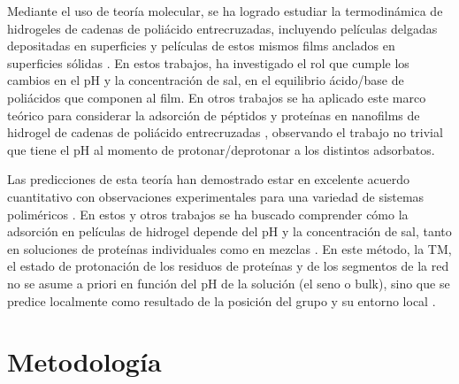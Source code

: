 Mediante el uso de teor\'ia  molecular, se ha logrado estudiar la termodin\'amica de hidrogeles de cadenas de poli\'acido entrecruzadas, incluyendo pel\'iculas delgadas depositadas en superficies \cite{longo2012molecular,nap2006weak} y pel\'iculas  de estos mismos films anclados en superficies s\'olidas \cite{longo2014non,longo2014equilibrium}.
En estos trabajos, \citet{longo2014equilibrium} ha investigado el rol que cumple los cambios en el pH y la concentraci\'on de sal, en el equilibrio \'acido/base de poli\'acidos que componen al film. En otros trabajos se ha aplicado este marco te\'orico para considerar la adsorci\'on de p\'eptidos y prote\'inas en nanofilms de hidrogel de cadenas de poli\'acido entrecruzadas \cite{longo2014equilibrium,narambuena2015lysozyme,longo2016adsorption,hagemann2018use,szleifer1997protein,fang2005kinetics}, observando el trabajo no trivial que tiene el pH al momento de protonar/deprotonar a los distintos adsorbatos.

Las predicciones de esta teor\'ia han demostrado estar en excelente acuerdo cuantitativo con observaciones experimentales para una variedad de sistemas polim\'ericos \cite{tagliazucchi2010responsive,wu2007behavior}. En estos y otros trabajos se ha buscado comprender c\'omo la adsorci\'on en  pel\'iculas de hidrogel depende del pH y la concentraci\'on de sal, tanto en soluciones de prote\'inas individuales como en mezclas \cite{hagemann2018use,tagliazucchi2010responsive,longo2016adsorption}. En este m\'etodo, la TM, el estado de protonaci\'on de los residuos de prote\'inas y de los segmentos de la red no se asume a priori en funci\'on del pH de la soluci\'on (el seno o bulk), sino que se predice localmente como resultado de la posici\'on del grupo y su entorno local \cite{longo2019protonation,tagliazucchi2010responsive}.\\


\section{Metodolog\'ia}

